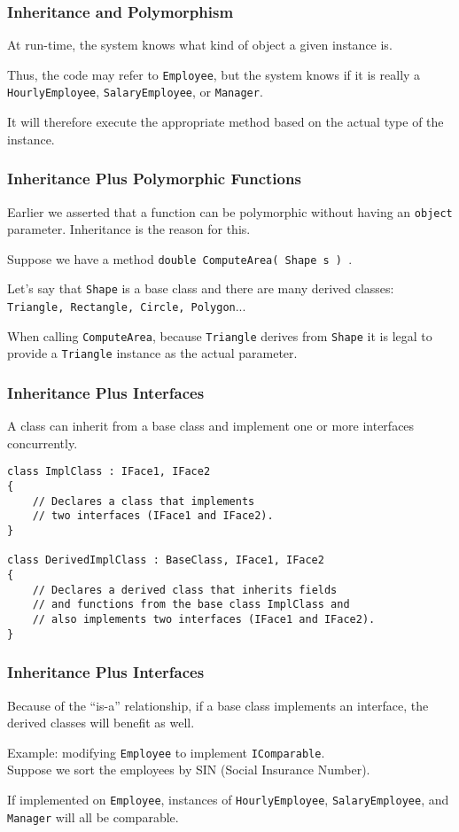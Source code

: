 \begin{frame}
\frametitle{Inheritance and Polymorphism}

At run-time, the system knows what kind of object a given instance is.

Thus, the code may refer to \texttt{Employee}, but the system knows if it is really a \texttt{HourlyEmployee}, \texttt{SalaryEmployee}, or \texttt{Manager}.

It will therefore execute the appropriate method based on the actual type of the instance.

\end{frame}



\begin{frame}
\frametitle{Inheritance Plus Polymorphic Functions}
Earlier we asserted that a function can be polymorphic without having an \texttt{object} parameter. Inheritance is the reason for this.

Suppose we have a method \texttt{double ComputeArea( Shape s ) }.

Let's say that \texttt{Shape} is a base class and there are many derived classes: \texttt{Triangle, Rectangle, Circle, Polygon}...

When calling \texttt{ComputeArea}, because \texttt{Triangle} derives from \texttt{Shape} it is legal to provide a \texttt{Triangle} instance as the actual parameter.

\end{frame}


\begin{frame}[fragile]
\frametitle{Inheritance Plus Interfaces}

A class can inherit from a base class and implement one or more interfaces concurrently.


\begin{verbatim}
class ImplClass : IFace1, IFace2
{
    // Declares a class that implements 
    // two interfaces (IFace1 and IFace2).
}

class DerivedImplClass : BaseClass, IFace1, IFace2
{
    // Declares a derived class that inherits fields 
    // and functions from the base class ImplClass and 
    // also implements two interfaces (IFace1 and IFace2).
}

\end{verbatim}

\end{frame}

\begin{frame}[fragile]
\frametitle{Inheritance Plus Interfaces}
Because of the ``is-a'' relationship, if a base class implements an interface, the derived classes will benefit as well.

Example: modifying \texttt{Employee} to implement \texttt{IComparable}.\\
\quad Suppose we sort the employees by SIN (Social Insurance Number).

If implemented on \texttt{Employee}, instances of \texttt{HourlyEmployee}, \texttt{SalaryEmployee}, and \texttt{Manager} will all be comparable.

\end{frame}


